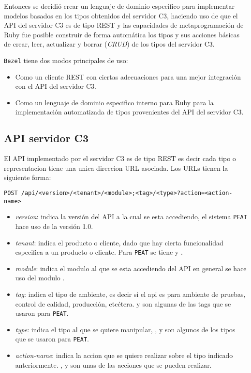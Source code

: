 Entonces se decidió crear un lenguaje de dominio especifico para implementar
modelos basados en los tipos obtenidos del servidor C3, haciendo uso de que el API
del servidor C3 es de tipo REST y las capacidades de metaprogramación de Ruby
fue posible construir de forma automática los tipos y sus acciones básicas
de crear, leer, actualizar y borrar (\textit{CRUD}) de los tipos del servidor C3.

\texttt{Bezel} tiene dos modos principales de uso:
\begin{itemize}
\item Como un cliente REST con ciertas adecuaciones para una mejor
  integración con el API del servidor C3.
\item Como un lenguaje de dominio especifico interno para Ruby para la
  implementación automatizada de tipos provenientes del API del servidor C3.
\end{itemize}

\subsection{API servidor C3}

El API implementado por el servidor C3 es de tipo REST es decir cada tipo
o representacion tiene una unica direccion URL asociada. Los URLs tienen
la siguiente forma:

\begin{verbatim}
POST /api/<version>/<tenant>/<module>;<tag>/<type>?action=<action-name>
\end{verbatim}

\begin{itemize}
\item \textit{version}: indica la versión del API a la cual se esta
  accediendo, el sistema \texttt{PEAT} hace uso de la versión 1.0.
\item \textit{tenant}: indica el producto o cliente, dado que hay
  cierta funcionalidad especifica a un producto o cliente. Para
  \texttt{PEAT} se tiene  y .
\item \textit{module}: indica el modulo al que se esta accediendo del API
  en general se hace uso del modulo .
\item \textit{tag}: indica el tipo de ambiente, es decir si el api
  es para ambiente de pruebas, control de calidad, producción, etcétera.
   y  son algunas de las tags
  que se usaron para \texttt{PEAT}.
\item \textit{type}: indica el tipo al que se quiere manipular, ,
   y  son algunos
  de los tipos que se usaron para \texttt{PEAT}.
\item \textit{action-name}: indica la accion que se quiere realizar sobre
  el tipo indicado anteriormente. ,  y
   son unas de las acciones que se pueden realizar.
\end{itemize}

